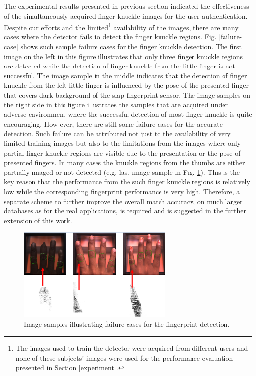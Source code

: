 The experimental results presented in previous section indicated the effectiveness of the simultaneously acquired finger knuckle images for the user authentication. Despite our efforts and the limited\footnote[2]{The images used to train the detector were acquired from different users and none of these subjects’ images were used for the performance evaluation presented in Section \ref{experiment}.}  availability of the images, there are many cases where the detector fails to detect the finger knuckle regions. Fig. \ref{failure-case} shows such sample failure cases for the finger knuckle detection. The first image on the left in this figure illustrates that only three finger knuckle regions are detected while the detection of finger knuckle from the little finger is not successful. The image sample in the middle indicates that the detection of finger knuckle from the left little finger is influenced by the pose of the presented finger that covers dark background of the slap fingerprint sensor. The image samples on the right side in this figure illustrates the samples that are acquired under adverse environment where the successful detection of most finger knuckle is quite encouraging. How-ever, there are still some failure cases for the accurate detection. Such failure can be attributed not just to the availability of very limited training images but also to the limitations from the images where only partial finger knuckle regions are visible due to the presentation or the pose of presented fingers.  In many cases the knuckle regions from the thumbs are either partially imaged or not detected (e.g. last image sample in Fig. \ref{failure-fingerprint}). This is the key reason that the performance from the such finger knuckle regions is relatively low while the corresponding fingerprint performance is very high. Therefore, a separate scheme to further improve the overall match accuracy, on much larger databases as for the real applications, is required and is suggested in the further extension of this work.  

\begin{figure}
    \begin{center}
        \includegraphics[width=3in]{Figures/failure-fingerprint.png}
    \end{center}
    \caption{Image samples illustrating failure cases for the fingerprint detection.}
    \label{failure-fingerprint}
\end{figure}

